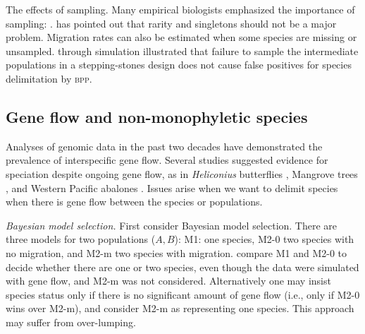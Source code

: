 \documentclass[A4]{article1}
\newcommand{\red}[1]{{\color{red}{#1}}}
\begin{document}
The effects of sampling.  Many empirical biologists emphasized the importance of
sampling: \citet{Chambers2020, Wells2022}.  \cite{Yang2017} has pointed out that rarity
and singletons should not be a major problem. Migration rates can also be estimated when
some species are missing or unsampled. \citet{Zhang2011} through simulation illustrated
that failure to sample the intermediate populations in a stepping-stones design does not
cause false positives for species delimitation by \textsc{bpp}.


\subsection{Gene flow and non-monophyletic species}

Analyses of genomic data in the past two decades have demonstrated the prevalence of
interspecific gene flow.  Several studies suggested evidence for speciation despite
ongoing gene flow, as in \textit{Heliconius} butterflies \citep{Martin2013}, Mangrove
trees \citep{He2019}, and Western Pacific abalones \citep{Hirase2021}.  Issues arise
when we want to delimit species when there is gene flow between the species or
populations.

\textit{Bayesian model selection.}  First consider Bayesian model selection. There are
three models for two populations ($A,B$): M1: one species, M2-0 two species with no
migration, and M2-m two species with migration.  \citet{Leache2019} compare M1 and M2-0 to
decide whether there are one or two species, even though the data were simulated with gene
flow, and M2-m was not considered.  Alternatively one may insist species status only if
there is no significant amount of gene flow (i.e., only if M2-0 wins over M2-m), and
consider M2-m as representing one species.  This approach may suffer from over-lumping. 
\red{[Generate an example.  What about the $ABCDX$ dataset?]}
\end{document}
